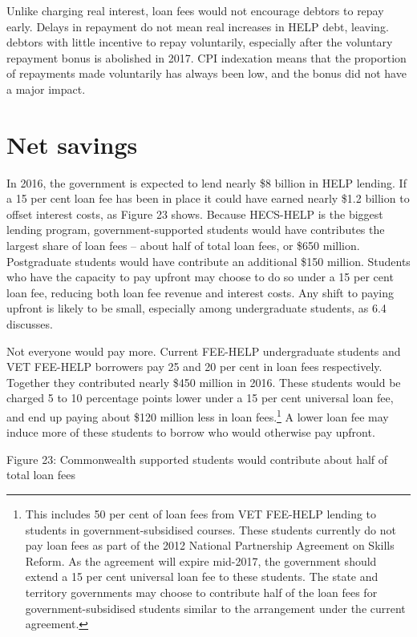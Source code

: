 \documentclass[]{book}
\begin{document}
Unlike charging real interest, loan fees would not encourage debtors to repay early. Delays in repayment do not mean real increases in HELP debt, leaving. debtors with little incentive to repay voluntarily, especially after the voluntary repayment bonus is abolished in 2017. CPI indexation means that the proportion of repayments made voluntarily has always been low, and the bonus did not have a major impact.

\section{Net savings}\label{net-savings}

In 2016, the government is expected to lend nearly \$8 billion in HELP lending. If a 15 per cent loan fee has been in place it could have earned nearly \$1.2 billion to offset interest costs, as Figure 23 shows. Because HECS-HELP is the biggest lending program, government-supported students would have contributes the largest share of loan fees -- about half of total loan fees, or \$650 million. Postgraduate students would have contribute an additional \$150 million. Students who have the capacity to pay upfront may choose to do so under a 15 per cent loan fee, reducing both loan fee revenue and interest costs. Any shift to paying upfront is likely to be small, especially among undergraduate students, as 6.4 discusses.

Not everyone would pay more. Current FEE-HELP undergraduate students and VET FEE-HELP borrowers pay 25 and 20 per cent in loan fees respectively. Together they contributed nearly \$450 million in 2016. These students would be charged 5 to 10 percentage points lower under a 15 per cent universal loan fee, and end up paying about \$120 million less in loan fees.\footnote{This includes 50 per cent of loan fees from VET FEE-HELP lending to students in government-subsidised courses. These students currently do not pay loan fees as part of the 2012 National Partnership Agreement on Skills Reform. As the agreement will expire mid-2017, the government should extend a 15 per cent universal loan fee to these students. The state and territory governments may choose to contribute half of the loan fees for government-subsidised students similar to the arrangement under the current agreement.} A lower loan fee may induce more of these students to borrow who would otherwise pay upfront.

\protect\hypertarget{_Ref325720481}{}{}Figure 23: Commonwealth supported students would contribute about half of total loan fees
\end{document}
